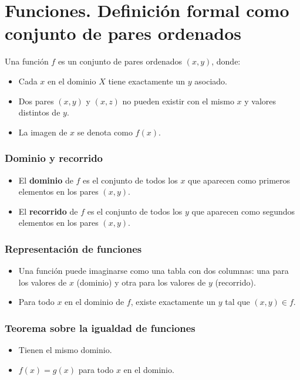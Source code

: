 \section*{Funciones. Definición formal como conjunto de pares ordenados}

Una función \( f \) es un conjunto de pares ordenados \( (x,y) \), donde:
\begin{itemize}
    \item Cada \( x \) en el dominio \( X \) tiene exactamente un \( y \) asociado.
    \item Dos pares \( (x,y) \) y \( (x,z) \) no pueden existir con el mismo \( x \) y valores distintos de \( y \).
    \item La imagen de  \( x \) se denota como \( f(x) \).
\end{itemize}

\subsubsection*{Dominio y recorrido}
\begin{itemize}
    \item El \textbf{dominio} de \( f \) es el conjunto de todos los \( x \) que aparecen como primeros elementos en los pares \( (x,y) \).
    \item El \textbf{recorrido} de \( f \) es el conjunto de todos los \( y \) que aparecen como segundos elementos en los pares \( (x,y) \).
\end{itemize}

\subsubsection*{Representación de funciones}
\begin{itemize}
    \item Una función puede imaginarse como una tabla con dos columnas: una para los valores de \( x \) (dominio) y otra para los valores de \( y \) (recorrido).
    \item Para todo \( x \) en el dominio de \( f \), existe exactamente un \( y \) tal que \( (x,y) \in f \).
\end{itemize}

\subsubsection*{Teorema sobre la igualdad de funciones}
\begin{itemize}
    \item Tienen el mismo dominio.
    \item \( f(x) = g(x) \) para todo \( x \) en el dominio.
\end{itemize}
